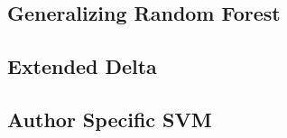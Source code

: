 \subsection{Generalizing Random Forest}

\subsection{Extended Delta}

\subsection{Author Specific SVM}
